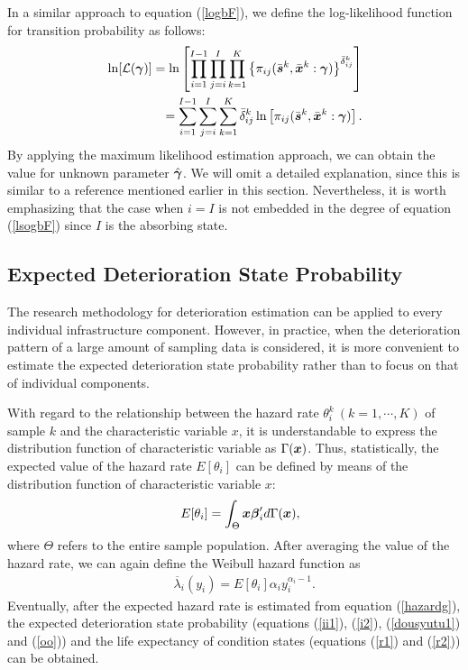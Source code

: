 In a similar approach to equation (\ref{logbF}), we define the log-likelihood function for transition probability as follows:
\begin{eqnarray}
&& \hspace{-3mm} \ln[{\cal L}(\mbox{\boldmath$\gamma$})] = \ln
\left[\prod_{i=1}^{I-1}\prod_{j=i}^{I} \prod_{k=1}^{K}
\left\{\pi_{ij}(\bar{\mbox{\boldmath$s$}}^k,\bar{\mbox{\boldmath$x$}}^k:\mbox{\boldmath$\gamma$})\right\}^{\bar{\delta}_{ij}^k}\right]
\nonumber \\
&& \hspace{5mm} = \sum_{i=1}^{I-1} \sum_{j=i}^I \sum_{k=1}^{K}\bar{\delta}_{ij}^k
\ln\left[
\pi_{ij}(\bar{\mbox{\boldmath$s$}}^k,\bar{\mbox{\boldmath$x$}}^k:\mbox{\boldmath$\gamma$})\right].
\label{lsogbF}
\end{eqnarray}
By applying the maximum likelihood estimation approach, we can obtain the value for unknown parameter $\hat{\mbox{\boldmath$\gamma$}}$. We will omit a detailed explanation, since this is similar to a reference mentioned earlier in this section. Nevertheless, it is worth emphasizing that the case when $i=I$ is not embedded in the degree of equation (\ref{lsogbF}) since $I$ is the absorbing state.
\subsection{Expected Deterioration State Probability}
\label{344}
The research methodology for deterioration estimation can be applied to every individual infrastructure component. However, in practice, when the deterioration pattern of a large amount of sampling data is considered, it is more convenient to estimate the expected deterioration state probability rather than to focus on that of individual components. 

With regard to the relationship between the hazard rate $\theta_i^k~(k=1,\cdots,K)$ of sample $k$ and the characteristic variable $x$, it is understandable to express the distribution function of characteristic variable as $\Gamma(\mbox{\boldmath$x$})$. Thus, statistically, the expected value of the hazard rate $E [\theta_i]$ can be defined by means of the distribution function of characteristic variable $x$:
\begin{eqnarray}
&& E[\theta_i]=\int_{\Theta}\mbox{\boldmath$x$}\mbox{\boldmath$\beta$}_i^\prime d\Gamma(\mbox{\boldmath$x$}),\label{oiu3}
\end{eqnarray}
where $\Theta$ refers to the entire sample population. After averaging the value of the hazard rate, we can again define the Weibull hazard function as
\begin{eqnarray}
&& \overline{\lambda}_i(y_i)=E[\theta_i] \alpha_{i} y_i^{\alpha_{i}-1}. \label{hazardg}
\end{eqnarray}
Eventually, after the expected hazard rate is estimated from equation (\ref{hazardg}), the expected deterioration state probability (equations (\ref{ii1}), (\ref{i2}), (\ref{dousyutu1}) and  (\ref{oo})) and the life expectancy of condition states (equations (\ref{r1}) and (\ref{r2})) can be obtained. 
